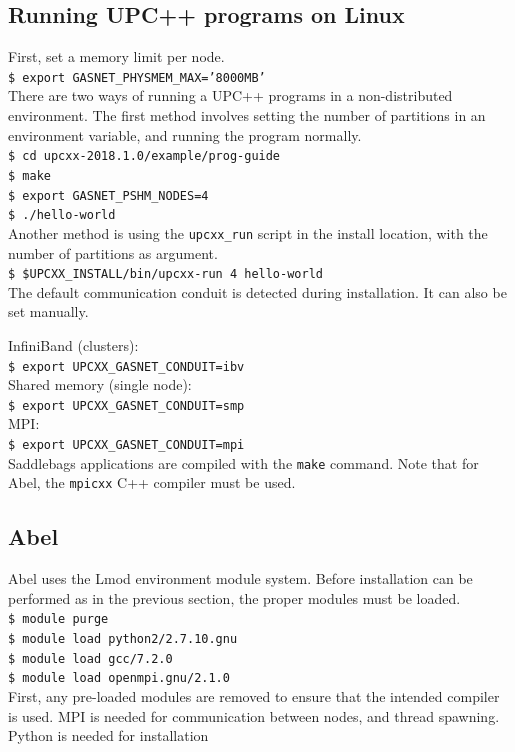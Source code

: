 \documentclass{uit-report}
\begin{document}
\subsection{Running UPC++ programs on Linux}\label{section:runlinux}
First, set a memory limit per node.\\
\phantom{11111} \texttt{\$ export GASNET\_PHYSMEM\_MAX='8000MB'}\\



There are two ways of running a UPC++ programs in a non-distributed environment. The first method involves setting the number of partitions in an environment variable, and running the program normally.\\
\phantom{11111} \texttt{\$ cd upcxx-2018.1.0/example/prog-guide}\\
\phantom{11111} \texttt{\$ make}\\
\phantom{11111} \texttt{\$ export GASNET\_PSHM\_NODES=4}\\
\phantom{11111} \texttt{\$ ./hello-world}\\

Another method is using the \texttt{upcxx\_run} script in the install location, with the number of partitions as argument.\\
\phantom{11111} \texttt{\$ \$UPCXX\_INSTALL/bin/upcxx-run 4 hello-world}\\

The default communication conduit is detected during installation. It can also be set manually.

InfiniBand (clusters):\\
\phantom{11111} \texttt{\$ export UPCXX\_GASNET\_CONDUIT=ibv}\\
Shared memory (single node):\\
\phantom{11111} \texttt{\$ export UPCXX\_GASNET\_CONDUIT=smp}\\
MPI:\\
\phantom{11111} \texttt{\$ export UPCXX\_GASNET\_CONDUIT=mpi}\\

Saddlebags applications are compiled with the \texttt{make} command. Note that for Abel, the \texttt{mpicxx} C++ compiler must be used.
\subsection{Abel}
Abel uses the Lmod environment module system. Before installation can be performed as in the previous section, the proper modules must be loaded. \\
\phantom{11111} \texttt{\$ module purge}\\
\phantom{11111} \texttt{\$ module load python2/2.7.10.gnu}\\
\phantom{11111} \texttt{\$ module load gcc/7.2.0}\\
\phantom{11111} \texttt{\$ module load openmpi.gnu/2.1.0}  \\
First, any pre-loaded modules are removed to ensure that the intended compiler is used. MPI is needed for communication between nodes, and thread spawning. Python is needed for installation 
\end{document}
